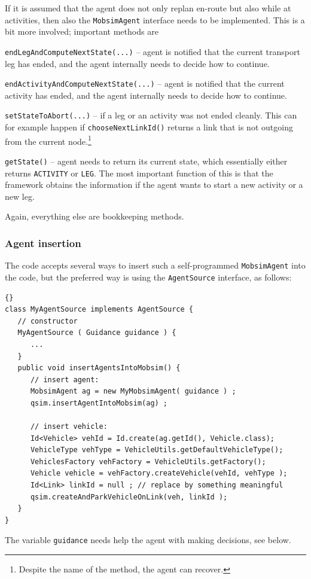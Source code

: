 If it is assumed that the agent does not only replan en-route but also while at activities, then also the \verb$MobsimAgent$ interface needs to be implemented.  This is a bit more involved; important methods are
\begin{compactitem}

\item \verb$endLegAndComputeNextState(...)$ -- agent is notified that the current transport leg has ended, and the agent internally needs to decide how to continue.

\item \verb$endActivityAndComputeNextState(...)$ -- agent is notified that the current activity has ended, and the agent internally needs to decide how to continue.

\item \verb$setStateToAbort(...)$ -- if a leg or an activity was not ended cleanly.  This can for example happen if \verb$chooseNextLinkId()$ returns a link that is not outgoing from the current node.\footnote{%
%
Despite the name of the method, the agent can recover.  %
}

\item \verb$getState()$ -- agent needs to return its current state, which essentially either returns \verb$ACTIVITY$ or \verb$LEG$.  The most important function of this is that the framework obtains the information if the agent wants to start a new activity or a new leg.

\end{compactitem}
Again, everything else are bookkeeping methods.

\subsubsection{Agent insertion}

The code accepts several ways to insert such a self-programmed \verb$MobsimAgent$ into the code, but the preferred way is using the \verb$AgentSource$ interface, as follows:
\begin{lstlisting}[basicstyle=\footnotesize\tt]{}
class MyAgentSource implements AgentSource {
   // constructor
   MyAgentSource ( Guidance guidance ) {
      ...
   }
   public void insertAgentsIntoMobsim() {
      // insert agent:
      MobsimAgent ag = new MyMobsimAgent( guidance ) ;
      qsim.insertAgentIntoMobsim(ag) ;
        
      // insert vehicle:
      Id<Vehicle> vehId = Id.create(ag.getId(), Vehicle.class);
      VehicleType vehType = VehicleUtils.getDefaultVehicleType();
      VehiclesFactory vehFactory = VehicleUtils.getFactory();
      Vehicle vehicle = vehFactory.createVehicle(vehId, vehType );
      Id<Link> linkId = null ; // replace by something meaningful
      qsim.createAndParkVehicleOnLink(veh, linkId );
   }
}
\end{lstlisting}
The variable \verb$guidance$ needs help the agent with making decisions, see below.

